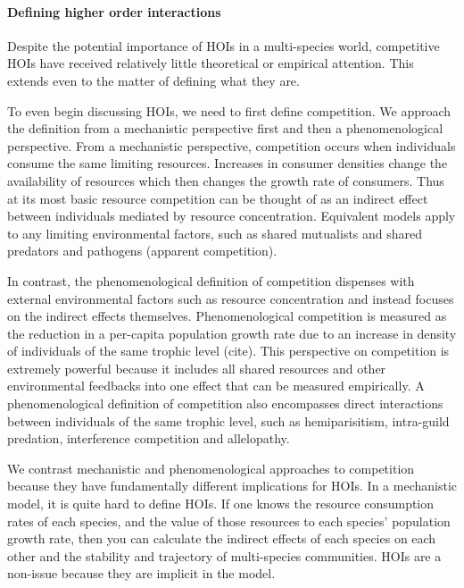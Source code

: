 \documentclass[12pt,]{article}
\let\oldparagraph\paragraph
\renewcommand{\paragraph}[1]{\oldparagraph{#1}\mbox{}}
\begin{document}
\paragraph{Defining higher order
interactions}\label{defining-higher-order-interactions}

Despite the potential importance of HOIs in a multi-species world,
competitive HOIs have received relatively little theoretical or
empirical attention. This extends even to the matter of defining what
they are.

To even begin discussing HOIs, we need to first define competition. We
approach the definition from a mechanistic perspective first and then a
phenomenological perspective. From a mechanistic perspective,
competition occurs when individuals consume the same limiting resources.
Increases in consumer densities change the availability of resources
which then changes the growth rate of consumers. Thus at its most basic
resource competition can be thought of as an indirect effect between
individuals mediated by resource concentration. Equivalent models apply
to any limiting environmental factors, such as shared mutualists and
shared predators and pathogens (apparent competition).

In contrast, the phenomenological definition of competition dispenses
with external environmental factors such as resource concentration and
instead focuses on the indirect effects themselves. Phenomenological
competition is measured as the reduction in a per-capita population
growth rate due to an increase in density of individuals of the same
trophic level (cite). This perspective on competition is extremely
powerful because it includes all shared resources and other
environmental feedbacks into one effect that can be measured
empirically. A phenomenological definition of competition also
encompasses direct interactions between individuals of the same trophic
level, such as hemiparisitism, intra-guild predation, interference
competition and allelopathy.

We contrast mechanistic and phenomenological approaches to competition
because they have fundamentally different implications for HOIs. In a
mechanistic model, it is quite hard to define HOIs. If one knows the
resource consumption rates of each species, and the value of those
resources to each species' population growth rate, then you can
calculate the indirect effects of each species on each other and the
stability and trajectory of multi-species communities. HOIs are a
non-issue because they are implicit in the model.
\end{document}
